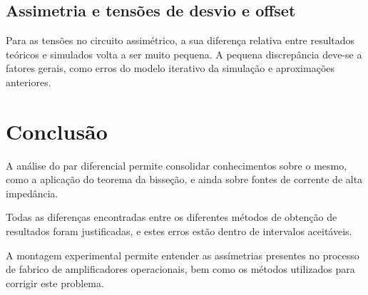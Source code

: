 \documentclass[a4paper,2pt]{report}
\begin{document}
\subsection{Assimetria e tensões de desvio e offset}
\par Para as tensões no circuito assimétrico, a sua diferença relativa entre resultados teóricos e simulados volta a ser muito pequena. A pequena discrepância deve-se a fatores gerais, como erros do modelo iterativo da simulação e aproximações anteriores.

\section{Conclusão}
\par A análise do par diferencial permite consolidar conhecimentos sobre o mesmo, como a aplicação do teorema da bisseção, e ainda sobre fontes de corrente de alta impedância.
\par Todas as diferenças encontradas entre os diferentes métodos de obtenção de resultados foram justificadas, e estes erros estão dentro de intervalos aceitáveis. 
\par A montagem experimental permite entender as assímetrias presentes no processo de fabrico de amplificadores operacionais, bem como os métodos utilizados para corrigir este problema.
\end{document}
